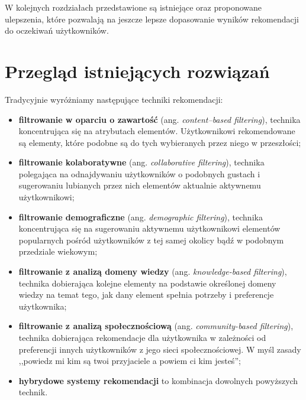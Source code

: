 \documentclass[twoside]{iisthesis}
\begin{document}
	 
	 W kolejnych rozdziałach przedstawione są istniejące oraz proponowane ulepszenia, które pozwalają na jeszcze lepsze dopasowanie wyników rekomendacji do oczekiwań użytkowników. 
	 
	 
 
 \chapter{Przegląd istniejących rozwiązań}
	 Tradycyjnie wyróżniamy następujące techniki rekomendacji: 
	 
	 \begin{itemize}
	 	\item \textbf{filtrowanie w oparciu o zawartość} (ang. \textit{content--based filtering}), technika koncentrująca się na atrybutach elementów. Użytkownikowi rekomendowane są elementy, które podobne są do tych wybieranych przez niego w przeszłości;
	 	\item \textbf{filtrowanie kolaboratywne} (ang. \textit{collaborative filtering}), technika polegająca na odnajdywaniu użytkowników o podobnych gustach i sugerowaniu lubianych przez nich elementów aktualnie aktywnemu użytkownikowi;
	 	\item \textbf{filtrowanie demograficzne} (ang. \textit{demographic filtering}), technika koncentrująca się na sugerowaniu aktywnemu użytkownikowi elementów popularnych pośród użytkowników z tej samej okolicy bądź w podobnym przedziale wiekowym;
	 	\item \textbf{filtrowanie z analizą domeny wiedzy} (ang. \textit{knowledge-based filtering}), technika dobierająca kolejne elementy na podstawie określonej domeny wiedzy na temat tego, jak dany element spełnia potrzeby i preferencje użytkownika;	
	 	\item \textbf{filtrowanie z analizą społecznościową} (ang. \textit{community-based filtering}), technika dobierająca rekomendacje dla użytkownika w zależności od preferencji innych użytkowników z jego sieci społecznościowej. W myśl zasady ,,powiedz mi kim są twoi przyjaciele a powiem ci kim jesteś'';
	 	\item \textbf{hybrydowe systemy rekomendacji} to kombinacja dowolnych powyższych technik.
	 \end{itemize}
	 
\end{document}
